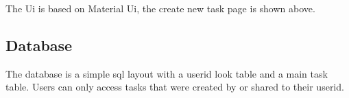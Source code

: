 \documentclass{article}
\begin{document}
The Ui is based on Material Ui\cite{mui}, the create new task page is shown above.

\subsection{Database}
The database is a simple \Gls{sql} layout with a userid look table and a main task table. Users can only access tasks that were created by or shared to their userid.


\pagebreak
\printglossaries

\printbibliography
\end{document}
